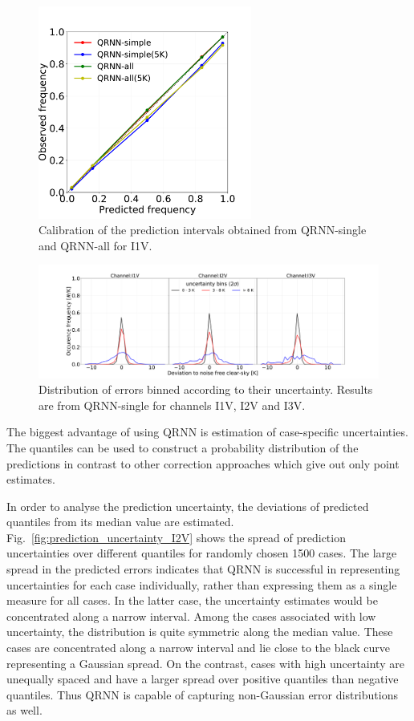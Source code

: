 \documentclass[amt, manuscript]{copernicus}
\begin{document}
\begin{figure}[t]
	\includegraphics[height = 70mm]{Figures/calibration_QRNN_I1V.pdf}	
	\caption{Calibration of the prediction intervals obtained from QRNN-single and QRNN-all for I1V. }
	\label{fig:calibration_I1V}	
\end{figure}
\begin{figure}[t]
	\includegraphics[width=\textwidth]{Figures/PDF_uncertainty_bins_QRNN-single.pdf}	
	\caption{Distribution of errors binned according to their uncertainty. Results are from QRNN-single for channels I1V, I2V and I3V.}
	\label{fig:error_distribution_uncertainty_bins}	
\end{figure}

The biggest advantage of using QRNN is estimation of case-specific uncertainties. The quantiles can be used to construct a probability distribution of the predictions in contrast to other correction approaches which give out only point estimates. 

In order to analyse the prediction uncertainty, the deviations of predicted quantiles from its median value are estimated. Fig.~\ref{fig:prediction_uncertainty_I2V} shows the spread of prediction uncertainties over different quantiles for randomly chosen 1500 cases. The large spread in the predicted errors indicates that QRNN is successful in representing uncertainties for each case individually, rather than expressing them as a single measure for all cases. In the latter case, the uncertainty estimates would be concentrated along a narrow interval. Among the cases associated with low uncertainty, the distribution is quite symmetric along the median value. These cases are concentrated along a narrow interval and lie close to the black curve representing a Gaussian spread. On the contrast, cases with high uncertainty are unequally spaced and have a larger spread over positive quantiles than negative quantiles. Thus QRNN is capable of capturing non-Gaussian  error distributions as well. 
\end{document}
